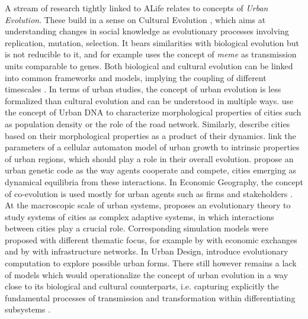 \documentclass[letterpaper]{article}
\begin{document}

A stream of research tightly linked to ALife relates to concepts of \emph{Urban Evolution}. These build in a sense on Cultural Evolution \citep{mesoudi2001cultural}, which aims at understanding changes in social knowledge as evolutionary processes involving replication, mutation, selection. It bears similarities with biological evolution but is not reducible to it, and for example uses the concept of \emph{meme} as transmission units comparable to genes. Both biological and cultural evolution can be linked into common frameworks and models, implying the coupling of different timescales \citep{bull2000meme}. In terms of urban studies, the concept of urban evolution is less formalized than cultural evolution and can be understood in multiple ways. \cite{votsis2019urban} use the concept of Urban DNA to characterize morphological properties of cities such as population density or the role of the road network. Similarly, \cite{kaya2017urban} describe cities based on their morphological properties as a product of their dynamics. \cite{wu2011urban} link the parameters of a cellular automaton model of urban growth to intrinsic properties of urban regions, which should play a role in their overall evolution. \cite{d2014urban} propose an urban genetic code as the way agents cooperate and compete, cities emerging as dynamical equilibria from these interactions. In Economic Geography, the concept of co-evolution is used mostly for urban agents such as firms and stakeholders \citep{gong2019co}. At the macroscopic scale of urban systems, \cite{pumain2018evolutionary} proposes an evolutionary theory to study systems of cities as complex adaptive systems, in which interactions between cities play a crucial role. Corresponding simulation models were proposed with different thematic focus, for example by \cite{cottineau2015modular} with economic exchanges and by \cite{raimbault2020indirect} with infrastructure networks. In Urban Design, \cite{batty2009digital} introduce evolutionary computation to explore possible urban forms. There still however remains a lack of models which would operationalize the concept of urban evolution in a way close to its biological and cultural counterparts, i.e. capturing explicitly the fundamental processes of transmission and transformation within differentiating subsystems \citep{durham1991coevolution}.


\end{document}
